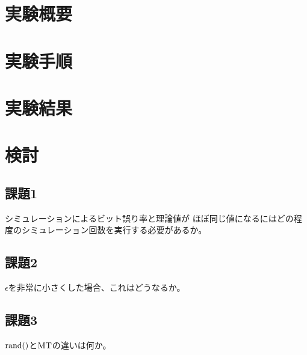 \documentclass[12pt]{jarticle}
\begin{document}



\section{実験概要}
\section{実験手順}

\section{実験結果}
\section{検討}
\subsection{課題1}
\begin{shadebox}
    シミュレーションによるビット誤り率と理論値が
    ほぼ同じ値になるにはどの程度のシミュレーション回数を実行する必要があるか。
\end{shadebox}
\subsection{課題2}
\begin{shadebox}
    $\epsilon$を非常に小さくした場合、これはどうなるか。
\end{shadebox}
\subsection{課題3}
\begin{shadebox}
    $\rm{rand()}$と$\rm{MT}$の違いは何か。
\end{shadebox}
\end{document}
